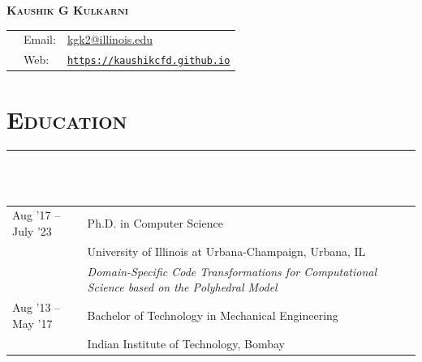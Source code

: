 \documentclass[letterpaper, 13pt]{article}
\begin{document}

\begin{center}
    \LARGE
    \textsc{\textbf{Kaushik G Kulkarni}}\\
    \vspace{1ex}
    \normalsize
    \begin{tabular}{p{}p{8ex} p{}}
        & Email:      &\href{mailto:kgk2@illinois.edu}{kgk2@illinois.edu}\\
        & Web:        & \texttt{\small \url{https://kaushikcfd.github.io}} \\
    \end{tabular}
\end{center}



\section*{\Large\textsc{Education}}
\vspace{-4ex}
\rule{\textwidth}{0.1ex}\\
\vspace{1ex}\\
\begin{tabular}{p{} p{}}
Aug '17 -- July '23  & Ph.D. in Computer Science \\
                     & {\small University of Illinois at Urbana-Champaign, Urbana, IL} \\
                     & {\small \textit{Domain-Specific Code Transformations for
                     Computational Science based on the Polyhedral
                     Model}}\vspace{1ex}\\
Aug '13 -- May '17   & Bachelor of Technology in Mechanical Engineering \\
                     & {\small Indian Institute of Technology, Bombay} \\
\end{tabular}


\end{document}
